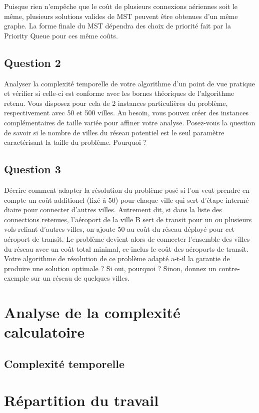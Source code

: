 \documentclass[11pt]{article}
\begin{document}
Puisque rien n'empêche que le coût de plusieurs connexions aériennes soit
le même, plusieurs solutions valides de MST peuvent être obtenues d'un même
graphe. La forme finale du MST dépendra des choix de priorité fait par la Priority Queue pour ces même coûts.

\subsection*{Question 2}
Analyser la complexité temporelle de votre algorithme d’un point de vue pratique
et vérifier si celle-ci est conforme avec les bornes théoriques de l’algorithme retenu.
Vous disposez pour cela de 2 instances particulières du problème, respectivement
avec 50 et 500 villes. Au besoin, vous pouvez créer des instances complémentaires
de taille variée pour affiner votre analyse. Posez-vous la question de
savoir si le nombre de villes du réseau potentiel est le seul paramètre caractérisant
la taille du problème. Pourquoi ?



\subsection*{Question 3}
Décrire comment adapter la résolution du problème posé si l’on veut prendre en
compte un coût additionel (fixé à 50) pour chaque ville qui sert d’étape intermé-
diaire pour connecter d’autres villes. Autrement dit, si dans la liste des connections
retenues, l’aéroport de la ville B sert de transit pour un ou plusieurs vols
reliant d’autres villes, on ajoute 50 au coût du réseau déployé pour cet aéroport
de transit. Le problème devient alors de connecter l’ensemble des villes du réseau
avec un coût total minimal, ce-inclus le coût des aéroports de transit.
Votre algorithme de résolution de ce problème adapté a-t-il la garantie de produire
une solution optimale ? Si oui, pourquoi ? Sinon, donnez un contre-exemple sur
un réseau de quelques villes.




\section{Analyse de la complexité calculatoire}
\subsection{Complexité temporelle}

\section{Répartition du travail}
\end{document}
